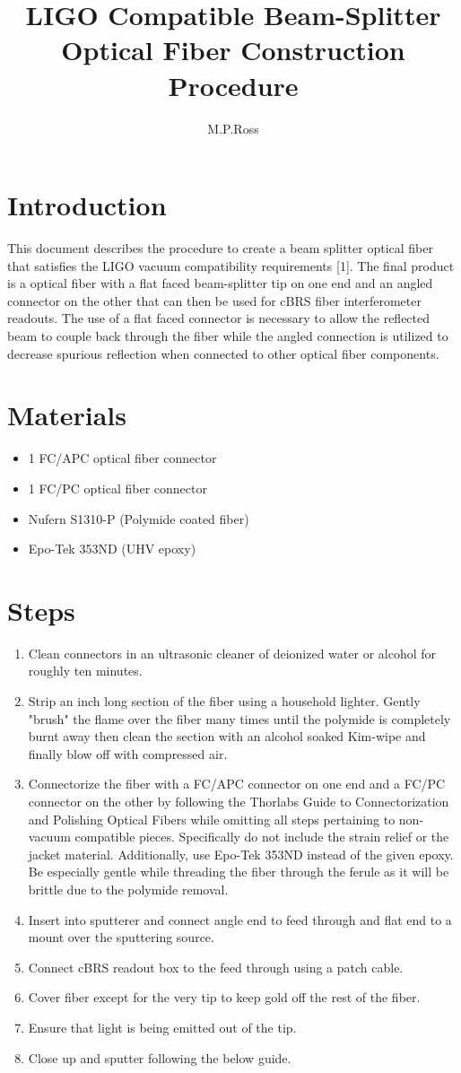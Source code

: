 \documentclass{article}
\title{LIGO Compatible Beam-Splitter Optical Fiber Construction Procedure}
\author{M.P.Ross}
\begin{document}
\maketitle
\section{Introduction}
This document describes the procedure to create a beam splitter optical fiber that satisfies the LIGO vacuum compatibility requirements [1]. The final product is a optical fiber with a flat faced beam-splitter tip on one end and an angled connector on the other that can then be used for cBRS fiber interferometer readouts. The use of a flat faced connector is necessary to allow the reflected beam to couple back through the fiber while the angled connection is utilized to decrease spurious reflection when connected to other optical fiber components.
\section{Materials}
\begin{itemize}
\item 1 FC/APC optical fiber connector
\item 1 FC/PC optical fiber connector
\item Nufern S1310-P (Polymide coated fiber)
\item Epo-Tek 353ND (UHV epoxy)
\end{itemize}
\section{Steps}
\begin{enumerate}
\item Clean connectors in an ultrasonic cleaner of deionized water or alcohol for roughly ten minutes.
\item Strip an inch long section of the fiber using a household lighter. Gently "brush" the flame over the fiber many times until the polymide is completely burnt away then clean the section with an alcohol soaked Kim-wipe and finally blow off with compressed air.
\item Connectorize the fiber with a FC/APC connector on one end and a FC/PC connector on the other by following the Thorlabs Guide to Connectorization and Polishing Optical Fibers while omitting all steps pertaining to non-vacuum compatible pieces. Specifically do not include the strain relief or the jacket material. Additionally, use Epo-Tek 353ND instead of the given epoxy. Be especially gentle while threading the fiber through the ferule as it will be brittle due to the polymide removal.
\item Insert into sputterer and connect angle end to feed through and flat end to a mount over the sputtering source.
\item Connect cBRS readout box to the feed through using a patch cable.
\item Cover fiber except for the very tip to keep gold off the rest of the fiber.
\item Ensure that light is being emitted out of the tip.
\item Close up and sputter following the below guide.
\end{enumerate}
\end{document}

